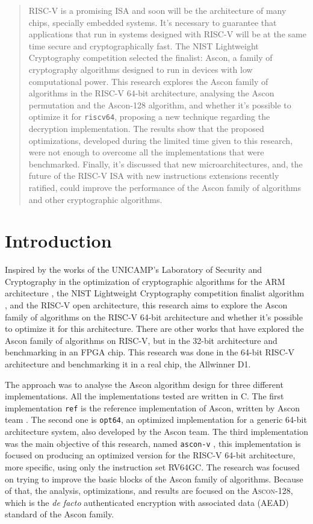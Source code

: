 \documentclass[11pt,twoside]{article}
\begin{document}
\begin{abstract}
  RISC-V is a promising ISA and soon will be the architecture of many chips, specially embedded systems. It's necessary to guarantee that applications that run in systems designed with RISC-V will be at the same time secure and cryptographically fast. The NIST Lightweight Cryptography competition selected the finalist: Ascon, a family of cryptography algorithms designed to run in devices with low computational power. This research explores the Ascon family of algorithms in the RISC-V 64-bit architecture, analysing the Ascon permutation and the Ascon-128 algorithm, and whether it's possible to optimize it for \texttt{riscv64}, proposing a new technique regarding the decryption implementation. The results show that the proposed optimizations, developed during the limited time given to this research, were not enough to overcome all the implementations that were benchmarked. Finally, it's discussed that new microarchitectures, and, the future of the RISC-V ISA with new instructions extensions recently ratified, could improve the performance of the Ascon family of algorithms and other cryptographic algorithms.
\end{abstract}

\section{Introduction}
Inspired by the works of the UNICAMP's Laboratory of Security and Cryptography in the optimization of cryptographic algorithms for the ARM architecture \cite{Fujii2017a}, the NIST Lightweight Cryptography competition finalist algorithm \cite{turan2023status}, and the RISC-V open architecture, this research aims to explore the Ascon family of algorithms \cite{asconv12nist} on the RISC-V 64-bit architecture and whether it's possible to optimize it for this architecture. There are other works that have explored the Ascon family of algorithms on RISC-V, but in the 32-bit architecture and benchmarking in an FPGA chip. This research was done in the 64-bit RISC-V architecture and benchmarking it in a real chip, the Allwinner D1.

The approach was to analyse the Ascon algorithm design for three different implementations. All the implementations tested are written in C. The first implementation \texttt{ref} is the reference implementation of Ascon, written by Ascon team \cite{asconc2023}. The second one is \texttt{opt64}, an optimized implementation for a generic 64-bit architecture system, also developed by the Ascon team. The  third implementation was the main objective of this research, named \texttt{ascon-v} \cite{asconv2023}, this implementation is focused on producing an optimized version for the RISC-V 64-bit architecture, more specific, using only the instruction set \textsf{RV64GC}. The research was focused on trying to improve the basic blocks of the Ascon family of algorithms. Because of that, the analysis, optimizations, and results are focused on the \textsc{Ascon-128}, which is the \textit{de facto} authenticated encryption with associated data (AEAD) standard of the Ascon family.
\end{document}
